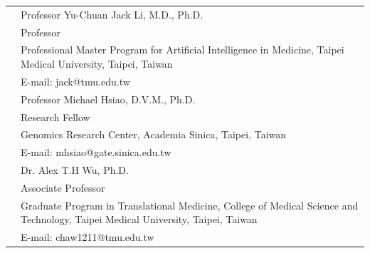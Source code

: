 \begin{longtable}{p{1.3in}p{4.8in}}
& Professor Yu-Chuan Jack Li, M.D.,  Ph.D.\\
& Professor\\
& Professional Master Program for Artificial Intelligence in Medicine, Taipei Medical University,
Taipei, Taiwan\\
& E-mail: jack@tmu.edu.tw\\[0.5cm]


& Professor Michael Hsiao, D.V.M., Ph.D.\\
& Research Fellow\\
& Genomics Research Center, 
Academia Sinica, Taipei, Taiwan\\
& E-mail: mhsiao@gate.sinica.edu.tw\\[1.35cm]

& Dr. Alex T.H Wu, Ph.D.\\
& Associate Professor\\
& Graduate Program in Translational Medicine,
College of Medical Science and Technology,
Taipei Medical University,
Taipei, Taiwan\\
& E-mail: chaw1211@tmu.edu.tw\\




\end{longtable}


\nohyphens{\color{OliveGreen}{Publications}} 
\printbibliography[heading=none] %

%
\nocite{*}

%